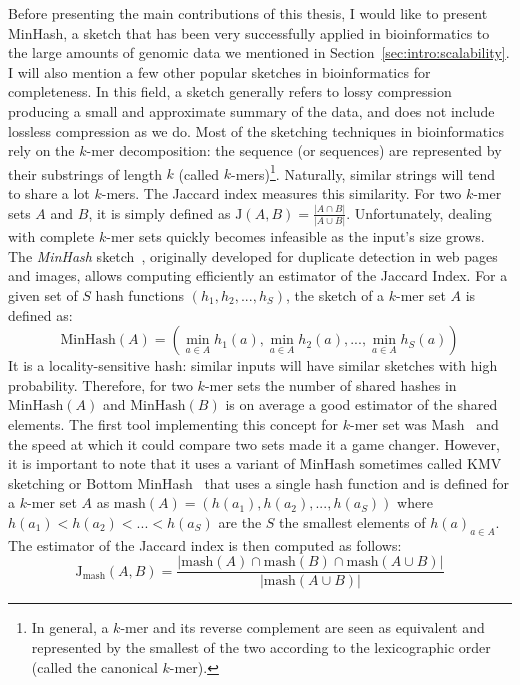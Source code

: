 Before presenting the main contributions of this thesis, I would like to present MinHash, a sketch that has been very successfully applied in bioinformatics to the large amounts of genomic data we mentioned in Section~\ref{sec:intro:scalability}. I will also mention a few other popular sketches in bioinformatics for completeness. 
In this field, a sketch generally refers to lossy compression producing a small and approximate summary of the data, and does not include lossless compression as we do.
Most of the sketching techniques in bioinformatics rely on the $k$-mer decomposition: the sequence (or sequences) are represented by their substrings of length $k$ (called $k$-mers)\footnote{In general, a $k$-mer and its reverse complement are seen as equivalent and represented by the smallest of the two according to the lexicographic order (called the canonical $k$-mer).}.
Naturally, similar strings will tend to share a lot $k$-mers. The Jaccard index measures this similarity. For two $k$-mer sets $A$ and $B$, it is simply defined as $ \mathrm{J}(A,B) = \frac{|A\cap B|}{|A \cup B|} $.
Unfortunately, dealing with complete $k$-mer sets quickly becomes infeasible as the input's size grows. 
The \textit{MinHash} sketch~\cite{MinHash97}, originally developed for duplicate detection in web pages and images, allows computing efficiently an estimator of the Jaccard Index. 
For a given set of $S$ hash functions $(h_1,h_2,...,h_S)$, the sketch of a $k$-mer set $A$ is defined as: $$ \mathrm{MinHash}(A) = (\min_{a \in A} h_1(a), \min_{a \in A} h_2(a), ..., \min_{a \in A} h_S(a) ) $$
%
It is a locality-sensitive hash: similar inputs will have similar sketches with high probability. Therefore, for two $k$-mer sets the number of shared hashes in $\mathrm{MinHash}(A)$ and $\mathrm{MinHash}(B)$ is on average a good estimator of the shared elements.
The first tool implementing this concept for $k$-mer set was Mash~\cite{ondov2016mash} and the speed at which it could compare two sets made it a game changer. However, it is important to note that it uses a variant of MinHash sometimes called KMV sketching or Bottom MinHash~\cite{bar2002counting} that uses a single hash function and is defined for a $k$-mer set $A$ as $\mathrm{mash}(A)=(h(a_1),h(a_2),...,h(a_S))$ where $h(a_1) < h(a_2) < ... <h(a_S)$ are the $S$ the smallest elements of ${h(a)}_{a\in A}$.
The estimator of the Jaccard index is then computed as follows: $$ \mathrm{J}_{\mathrm{mash}}(A,B) = \frac{|\mathrm{mash}(A)\cap \mathrm{mash}(B) \cap \mathrm{mash}(A \cup B) |}{|\mathrm{mash}(A \cup B)|}$$
